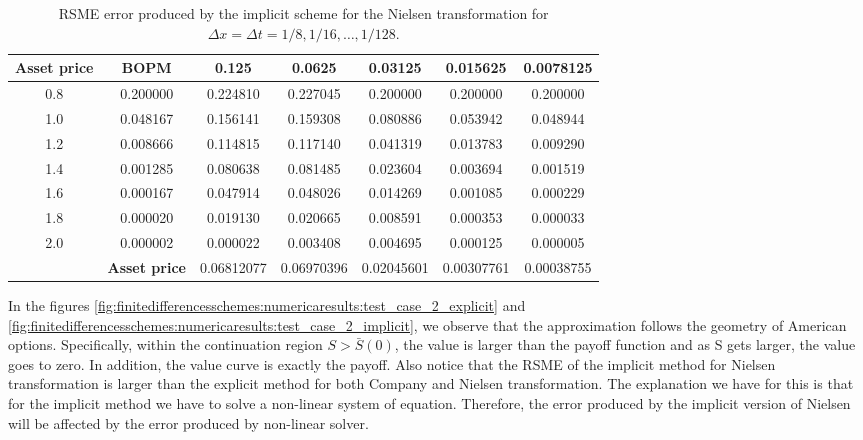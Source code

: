 \begin{table}[H]
  \centering
  \begin{tabular}{@{}ccccccc@{}}
  \toprule
  \textbf{Asset price} & \textbf{BOPM}        & 0.125      & 0.0625     & 0.03125    & 0.015625   & 0.0078125  \\ \midrule
  0.8                  & 0.200000             & 0.224810   & 0.227045   & 0.200000   & 0.200000   & 0.200000   \\
  1.0                  & 0.048167             & 0.156141   & 0.159308   & 0.080886   & 0.053942   & 0.048944   \\
  1.2                  & 0.008666             & 0.114815   & 0.117140   & 0.041319   & 0.013783   & 0.009290   \\
  1.4                  & 0.001285             & 0.080638   & 0.081485   & 0.023604   & 0.003694   & 0.001519   \\
  1.6                  & 0.000167             & 0.047914   & 0.048026   & 0.014269   & 0.001085   & 0.000229   \\
  1.8                  & 0.000020             & 0.019130   & 0.020665   & 0.008591   & 0.000353   & 0.000033   \\
  2.0                  & 0.000002             & 0.000022   & 0.003408   & 0.004695   & 0.000125   & 0.000005   \\
                       & \textbf{Asset price} & 0.06812077 & 0.06970396 & 0.02045601 & 0.00307761 & 0.00038755 \\ \bottomrule
  \end{tabular}
  \caption{\label{tab:rsme_implicit_nielsen_transformation}RSME error produced by the implicit scheme for the Nielsen transformation for $\Delta{x}=\Delta{t}=1/8,1/16,\dots,1/128$.}
\end{table}

In the figures  \eqref{fig:finitedifferencesschemes:numericaresults:test_case_2_explicit} and \eqref{fig:finitedifferencesschemes:numericaresults:test_case_2_implicit}, we observe that the approximation follows the geometry of American options. Specifically, within the continuation region $S>\bar{S}(0)$, the value is larger than the payoff function and as S gets larger, the value goes to zero. In addition, the value curve is exactly the payoff. Also notice that the RSME of the implicit method for Nielsen transformation is larger than the explicit method for both Company and Nielsen transformation. The explanation we have for this is that for the implicit method we have to solve a non-linear system of equation. Therefore, the error produced by the implicit version of Nielsen will be affected by the error produced by non-linear solver. 

